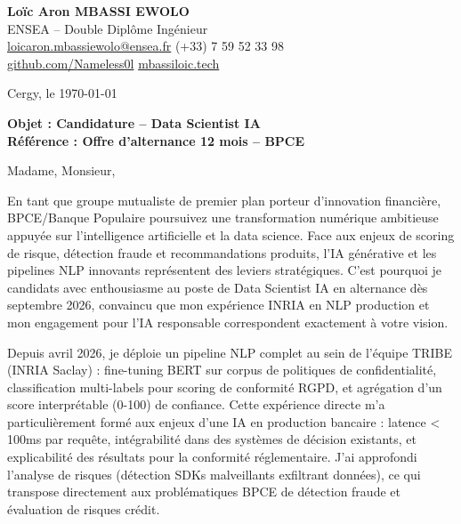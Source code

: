 \documentclass[a4paper,11pt]{article}
\begin{document}
\noindent
\textbf{Lo\"ic Aron MBASSI EWOLO} \\
ENSEA -- Double Dipl\^ome Ing\'enieur \\
\href{mailto:loicaron.mbassiewolo@ensea.fr}{loicaron.mbassiewolo@ensea.fr} \quad (+33) 7 59 52 33 98 \\
\href{https://github.com/Nameless0l}{github.com/Nameless0l} \quad \href{https://mbassiloic.tech}{mbassiloic.tech}

\vspace{1em}
\noindent
Cergy, le \today

\vspace{1em}
\noindent
\textbf{Objet : Candidature -- Data Scientist IA} \\
\textbf{R\'ef\'erence : Offre d'alternance 12 mois -- BPCE}

\vspace{1.5em}
\noindent Madame, Monsieur,

\vspace{0.8em}
\noindent En tant que groupe mutualiste de premier plan porteur d'innovation financière, BPCE/Banque Populaire poursuivez une transformation numérique ambitieuse appuyée sur l'intelligence artificielle et la data science. Face aux enjeux de scoring de risque, détection fraude et recommandations produits, l'IA générative et les pipelines NLP innovants représentent des leviers stratégiques. C'est pourquoi je candidats avec enthousiasme au poste de Data Scientist IA en alternance dès septembre 2026, convaincu que mon expérience INRIA en NLP production et mon engagement pour l'IA responsable correspondent exactement à votre vision.

\vspace{0.8em}
\noindent Depuis avril 2026, je déploie un pipeline NLP complet au sein de l'équipe TRIBE (INRIA Saclay) : fine-tuning BERT sur corpus de politiques de confidentialité, classification multi-labels pour scoring de conformité RGPD, et agrégation d'un score interprétable (0-100) de confiance. Cette expérience directe m'a particulièrement formé aux enjeux d'une IA en production bancaire : latence < 100ms par requête, intégrabilité dans des systèmes de décision existants, et explicabilité des résultats pour la conformité réglementaire. J'ai approfondi l'analyse de risques (détection SDKs malveillants exfiltrant données), ce qui transpose directement aux problématiques BPCE de détection fraude et évaluation de risques crédit.
\end{document}
